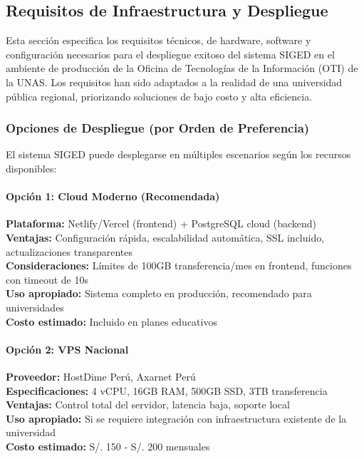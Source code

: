 \documentclass[12pt,a4paper]{article}
\begin{document}
\subsection{Requisitos de Infraestructura y Despliegue}

Esta sección especifica los requisitos técnicos, de hardware, software y configuración necesarios para el despliegue exitoso del sistema SIGED en el ambiente de producción de la Oficina de Tecnologías de la Información (OTI) de la UNAS. Los requisitos han sido adaptados a la realidad de una universidad pública regional, priorizando soluciones de bajo costo y alta eficiencia.


\subsubsection{Opciones de Despliegue (por Orden de Preferencia)}

El sistema SIGED puede desplegarse en múltiples escenarios según los recursos disponibles:

\paragraph{Opción 1: Cloud Moderno (Recomendada)}

\textbf{Plataforma:} Netlify/Vercel (frontend) + PostgreSQL cloud (backend)\\
\textbf{Ventajas:} Configuración rápida, escalabilidad automática, SSL incluido, actualizaciones transparentes\\
\textbf{Consideraciones:} Límites de 100GB transferencia/mes en frontend, funciones con timeout de 10s\\
\textbf{Uso apropiado:} Sistema completo en producción, recomendado para universidades\\
\textbf{Costo estimado:} Incluido en planes educativos

\paragraph{Opción 2: VPS Nacional}

\textbf{Proveedor:} HostDime Perú, Axarnet Perú\\
\textbf{Especificaciones:} 4 vCPU, 16GB RAM, 500GB SSD, 3TB transferencia\\
\textbf{Ventajas:} Control total del servidor, latencia baja, soporte local\\
\textbf{Uso apropiado:} Si se requiere integración con infraestructura existente de la universidad\\
\textbf{Costo estimado:} S/. 150 - S/. 200 mensuales
\end{document}
